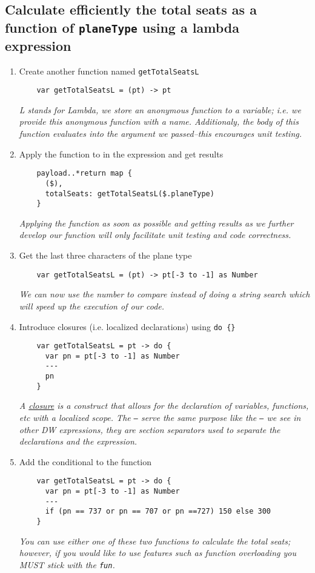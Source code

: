 \subsection{Calculate efficiently the total seats as a function of \texttt{planeType} using a lambda expression}
\begin{enumerate}[resume*]
\item Create another function named \texttt{getTotalSeatsL}
  \begin{lstlisting}
    var getTotalSeatsL = (pt) -> pt
  \end{lstlisting}
  \emph{
    L stands for Lambda, we store an anonymous function to a variable; i.e. we provide this anonymous function
    with a name.  Additionaly, the body of this function evaluates into the argument we passed--this encourages
    unit testing.
  }
\item Apply the function to in the expression and get results
  \begin{lstlisting}
    payload..*return map {
      ($),
      totalSeats: getTotalSeatsL($.planeType)
    }
  \end{lstlisting}
  \emph{
    Applying the function as soon as possible and getting results as we further develop our function
    will only facilitate unit testing and code correctness.
  }
\item Get the last three characters of the plane type
  \begin{lstlisting}
    var getTotalSeatsL = (pt) -> pt[-3 to -1] as Number
  \end{lstlisting}
  \emph{
    We can now use the number to compare instead of doing a string search which will speed up the execution of
    our code.
  }
\item Introduce closures (i.e. localized declarations) using \texttt{do \{\}}
  \begin{lstlisting}
    var getTotalSeatsL = pt -> do {
      var pn = pt[-3 to -1] as Number
      ---
      pn
    }
  \end{lstlisting}
  \emph{
    A \href{https://en.wikipedia.org/wiki/Closure_(computer_programming)}{closure} is a construct that allows for
    the declaration of variables, functions, etc with a localized scope.  The \texttt{---} serve the same purpose
    like the \texttt{---} we see in other DW expressions, they are section separators used to separate the
    declarations and the expression.
  }
\item Add the conditional to the function
  \begin{lstlisting}
    var getTotalSeatsL = pt -> do {
      var pn = pt[-3 to -1] as Number
      ---
      if (pn == 737 or pn == 707 or pn ==727) 150 else 300
    }    
  \end{lstlisting}
  \emph{
    You can use either one of these two functions to calculate the total seats; however, if you would like to use
    features such as function overloading you MUST stick with the \texttt{fun}.
  }
\end{enumerate}

